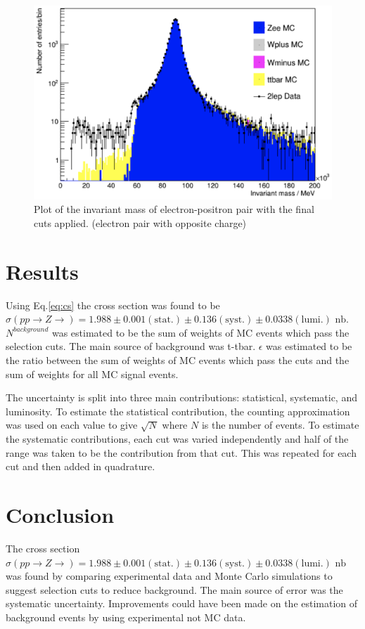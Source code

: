 \documentclass[%
 reprint,
 amsmath,amssymb,
 aps,
]{revtex4-2}
\begin{document}
\begin{figure}
    \centering
    \begin{minipage}{0.4\textwidth}
        \centering
        \includegraphics[width=\linewidth]{plots/invar-mass_full-cut_ee_nt.png}
    \end{minipage}
    \caption{Plot of the invariant mass of electron-positron pair with the final cuts applied. (electron pair with opposite charge)}
    \label{fig:invar-mass_final-cuts_ee}
\end{figure}
\section{Results}
Using Eq.\ref{eq:cs} the cross section was found to be $\sigma (pp \rightarrow Z \rightarrow ) = 1.988\pm0.001 (\text{stat.}) \pm 0.136 (\text{syst.}) \pm 0.0338 (\text{lumi.}) \text{ nb}$. $N^{background}$ was estimated to be the sum of weights of MC events which pass the selection cuts. The main source of background was t-tbar. $\epsilon$ was estimated to be the ratio between the sum of weights of MC events which pass the cuts and the sum of weights for all MC signal events.

The uncertainty is split into three main contributions: statistical, systematic, and luminosity. To estimate the statistical contribution, the counting approximation was used on each value to give $\sqrt{N}$ where $N$ is the number of events. To estimate the systematic contributions, each cut was varied independently and half of the range was taken to be the contribution from that cut. This was repeated for each cut and then added in quadrature. 
\section{Conclusion}
The cross section $\sigma (pp \rightarrow Z \rightarrow ) = 1.988\pm0.001 (\text{stat.}) \pm 0.136 (\text{syst.}) \pm 0.0338 (\text{lumi.}) \text{ nb}$ was found by comparing experimental data and Monte Carlo simulations to suggest selection cuts to reduce background.  The main source of error was the systematic uncertainty. Improvements could have been made on the estimation of background events by using experimental not MC data.


\end{document}
